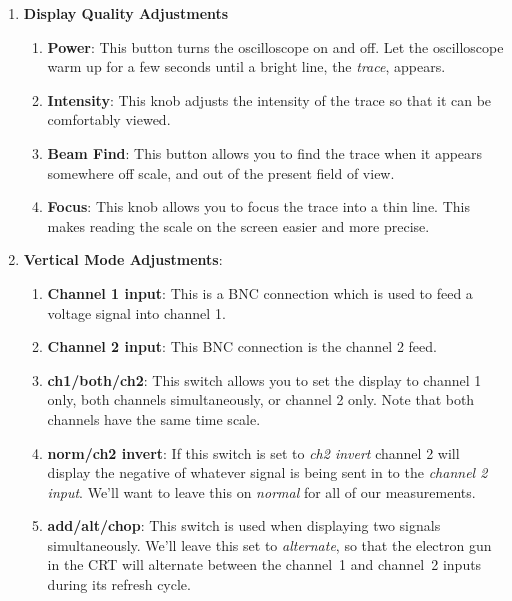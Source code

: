 \begin{enumerate}

\item {\bf Display Quality Adjustments}
	\begin{enumerate}
	\item {\bf Power}: This button turns the oscilloscope on and off.  
Let the oscilloscope warm up for a few seconds until a bright line, the 
{\it trace}, appears.

	\item {\bf Intensity}: This knob adjusts the intensity of the trace so
that it can be comfortably viewed. 

	\item {\bf Beam Find}: This button allows you to find the trace when 
it appears somewhere off scale, and out of the present field of view.   
 
	\item {\bf Focus}: This knob allows you to focus the trace into a thin 
line. This makes reading the scale on the screen easier and more precise.
	\end{enumerate}

\item {\bf Vertical Mode  Adjustments}:
	\begin{enumerate}
  	\item {\bf Channel 1 input}: This is a BNC connection which is used to 
feed a voltage signal into channel 1.

	\item {\bf Channel 2 input}: This BNC connection is the channel 2 feed.

	\item {\bf ch1/both/ch2}: This switch allows you to set the display to
channel 1 only, both channels simultaneously, or channel 2 only.  Note that
both channels have the same time scale.
 
	\item {\bf norm/ch2 invert}: If this switch is set to {\it ch2 invert}
channel 2 will display the negative of whatever signal is being sent in to the
{\it channel 2 input}.  We'll want to leave this on {\it normal} for all of our
measurements.

	\item {\bf add/alt/chop}: This switch is used when displaying two 
signals simultaneously.  We'll leave this set to {\it alternate}, so that the 
electron gun in the CRT will alternate between the channel~1 and channel~2 
inputs during its refresh cycle.  
 

\end{enumerate}
\end{enumerate}
